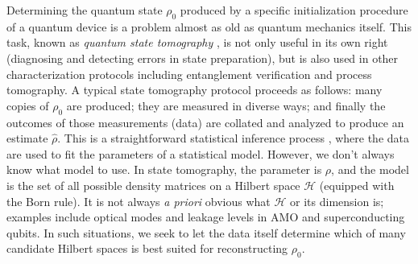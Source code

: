 \documentclass[aps,pra, twocolumn]{revtex4-1}
\newcommand{\cH}{\mathcal{H}}
\newcommand{\rhohat}{\hat{\rho}}
\begin{document}
Determining the quantum state $\rho_{0}$ produced by a specific initialization procedure of a quantum device is a problem almost as old as quantum mechanics itself. This task, known as \emph{quantum state tomography} \cite{Paris2004}, is not only useful in its own right (diagnosing and detecting errors in state preparation), but is also used in other characterization protocols including entanglement verification and process tomography. A typical state tomography protocol proceeds as follows: many copies of $\rho_{0}$ are produced; they are measured in diverse ways; and finally the outcomes of those measurements (data) are collated and analyzed to produce an estimate $\rhohat$.  This is a straightforward statistical inference process \cite{Reid2015, Wasserman2004}, where the data are used to fit the parameters of a statistical model.  However, we don't always know what model to use.  In state tomography, the parameter is $\rho$, and the model is the set of all possible density matrices on a Hilbert space $\cH$ (equipped with the Born rule). It is not always \emph{a priori} obvious what $\cH$ or its dimension is; examples include optical modes \cite{Altepeter2005, Bertrand1987, Lvovsky2009, Breitenbach1997, Leonhardt1995} and leakage levels in AMO and superconducting \cite{Motzoi2009, Fazio1999} qubits. In such situations, we seek to let the data itself determine which of many candidate Hilbert spaces is best suited for reconstructing $\rho_{0}$.
\end{document}
